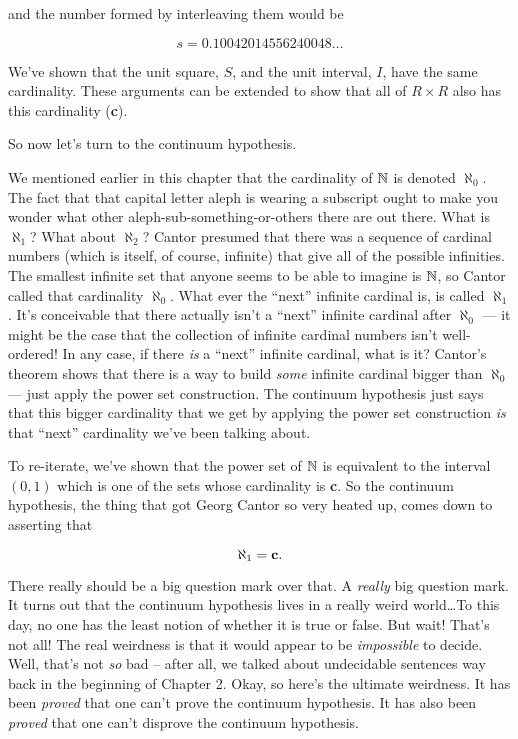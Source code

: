 \noindent and the number formed by interleaving them would be

\[ s = 0.10042014556240048 \ldots \]

We've shown that the unit square, $S$, and the unit interval, $I$, have the
same cardinality.  These arguments can be extended to show that all of $R \times R$ also has this cardinality ({\bf c}).

So now let's turn to the continuum hypothesis.  

We mentioned earlier in this chapter that the cardinality of ${\mathbb N}$ is
denoted $\aleph_0$.  The fact that that capital letter aleph is wearing a 
subscript ought to make you wonder what other aleph-sub-something-or-others 
there are out there.   What is $\aleph_1$?  What about $\aleph_2$?  Cantor
presumed that there was a sequence of cardinal numbers (which is itself, of course, infinite) that give all of the possible infinities.  The smallest infinite set that anyone seems to be able to imagine is ${\mathbb N}$, so Cantor called 
that cardinality $\aleph_0$.  What ever the ``next'' infinite cardinal is, is
called $\aleph_1$.  It's conceivable that there actually isn't a ``next'' infinite cardinal after $\aleph_0$ --- it might be the case that the collection of 
infinite cardinal numbers isn't well-ordered!  In any case, if there \emph{is} a 
``next'' infinite cardinal, what is it?  Cantor's theorem shows that there is
a way to build \emph{some} infinite cardinal bigger than $\aleph_0$ --- just
apply the power set construction.  The continuum hypothesis just says that this 
bigger cardinality that we get by applying the power set construction \emph{is} that ``next'' cardinality we've been talking about.

To re-iterate, we've shown that the power set of ${\mathbb N}$ is equivalent
to the interval $(0,1)$ which is one of the sets whose cardinality is {\bf c}.
So the continuum hypothesis, the thing that got Georg Cantor so very heated up,
comes down to asserting that

\[ \aleph_1 = \mbox{{\bf c}}. \]

There really should be a big question mark over that.  A \emph{really} big
question mark.  It turns out that the continuum hypothesis lives in a really
weird world\ldots   To this day, no one has the least notion of whether it 
is true or false.  But wait!  That's not all!  The real weirdness is that it
would appear to be \emph{impossible} to decide.  Well, that's not \emph{so} bad -- after all, we talked about undecidable sentences way back in the beginning 
of Chapter 2.   Okay, so here's the ultimate weirdness.  It has been \emph{proved} that one can't prove the continuum hypothesis.  It has also been \emph{proved} that one can't disprove the continuum hypothesis.   


